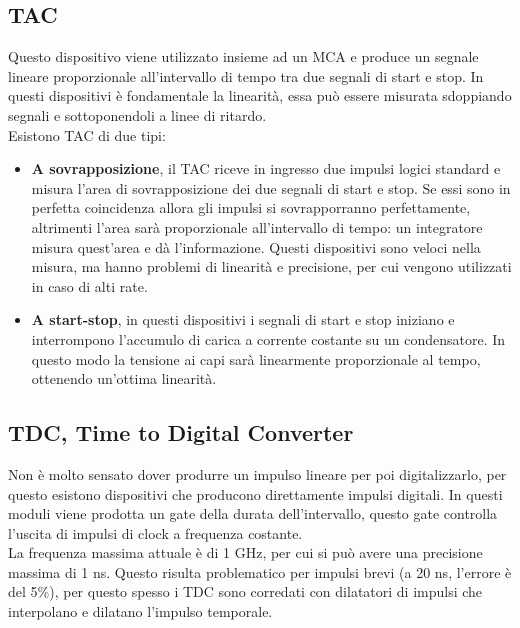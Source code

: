 \subsection{TAC}
Questo dispositivo viene utilizzato insieme ad un MCA e produce un segnale lineare proporzionale all'intervallo di tempo tra due segnali di start e stop.
In questi dispositivi \`e fondamentale la linearit\`a, essa pu\`o essere misurata sdoppiando segnali e sottoponendoli a linee di ritardo.\\
Esistono TAC di due tipi:
\begin{itemize}
\item \textbf{A sovrapposizione}, il TAC riceve in ingresso due impulsi logici standard e misura l'area di sovrapposizione dei due segnali di start e stop.
Se essi sono in perfetta coincidenza allora gli impulsi si sovrapporranno perfettamente, altrimenti l'area sar\`a proporzionale all'intervallo di tempo: un integratore misura quest'area e d\`a l'informazione.
Questi dispositivi sono veloci nella misura, ma hanno problemi di linearit\`a e precisione, per cui vengono utilizzati in caso di alti rate.
\item \textbf{A start-stop}, in questi dispositivi i segnali di start e stop iniziano e interrompono l'accumulo di carica a corrente costante su un condensatore.
In questo modo la tensione ai capi sar\`a linearmente proporzionale al tempo, ottenendo un'ottima linearit\`a.
\end{itemize}
\subsection{TDC, Time to Digital Converter}
Non \`e molto sensato dover produrre un impulso lineare per poi digitalizzarlo, per questo esistono dispositivi che producono direttamente impulsi digitali.
In questi moduli viene prodotta un gate della durata dell'intervallo, questo gate controlla l'uscita di impulsi di clock a frequenza costante.\\
La frequenza massima attuale \`e di 1 GHz, per cui si pu\`o avere una precisione massima di 1 ns. 
Questo risulta problematico per impulsi brevi (a 20 ns, l'errore \`e del 5\%), per questo spesso i TDC sono corredati con dilatatori di impulsi
che interpolano e dilatano l'impulso temporale.
